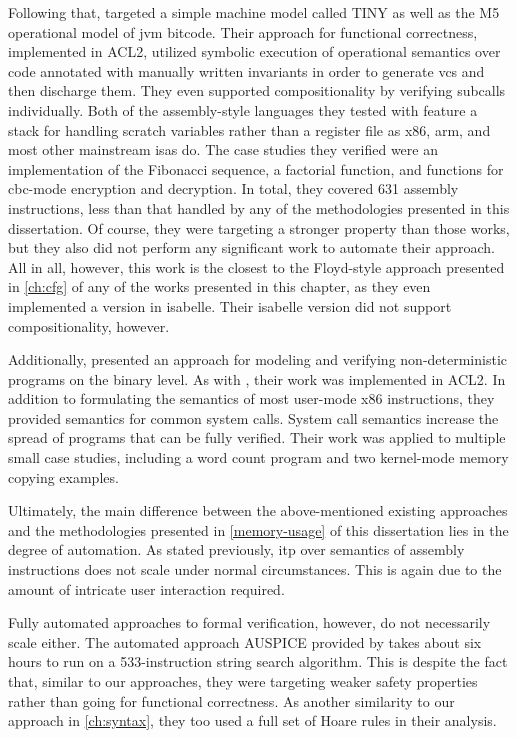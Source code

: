 Following that, \textcite{matthews2006verification}
targeted a simple machine model called TINY
as well as the M5 operational model of \gls{jvm} bitcode.
Their approach for functional correctness, implemented in ACL2,
utilized symbolic execution of operational semantics
over code annotated with manually written invariants
in order to generate \glspl{vc} and then discharge them.
They even supported compositionality by verifying subcalls individually.
Both of the assembly-style languages they tested with feature a stack
for handling scratch variables rather than a register file
as \gls{x86}, \gls{arm}, and most other mainstream \glspl{isa} do.
The case studies they verified were an implementation of the Fibonacci sequence,
a factorial function, and functions for \gls{cbc}-mode encryption and decryption.
In total, they covered \num{631} assembly instructions,
less than that handled by any of the methodologies presented in this dissertation.
Of course, they were targeting a stronger property than those works,
but they also did not perform any significant work to automate their approach.
All in all, however, this work is the closest to the Floyd-style approach
presented in \cref{ch:cfg} of any of the works presented in this chapter,
as they even implemented a version in \gls{isabelle}. Their \gls{isabelle} version did not support compositionality, however.

Additionally, \textcite{goel2014syscalls,goelphd} presented an approach for modeling and verifying
non-deterministic programs on the binary level.
As with \textcite{matthews2006verification}, their work was implemented in ACL2.
In addition to formulating the semantics of most user-mode \gls{x86} instructions,
they provided semantics for common system calls.
System call semantics increase the spread of programs that can be fully verified.
Their work was applied to multiple small case studies,
including a word count program and two kernel-mode memory copying examples.

Ultimately, the main difference between the above-mentioned existing approaches
and the methodologies presented in \cref{memory-usage} of this dissertation lies in the degree of automation.
As stated previously, \gls{itp} over semantics of assembly instructions
does not scale under normal circumstances.
This is again due to the amount of intricate user interaction required.

Fully automated approaches to formal verification, however,
do not necessarily scale either.
The automated approach AUSPICE provided by \textcite{tan2015auspice}
takes about six hours to run on a \num{533}-instruction string search algorithm.
This is despite the fact that, similar to our approaches, %
they were targeting weaker safety properties
rather than going for functional correctness.
As another similarity to our approach in \cref{ch:syntax},
they too used a full set of Hoare rules in their analysis.

